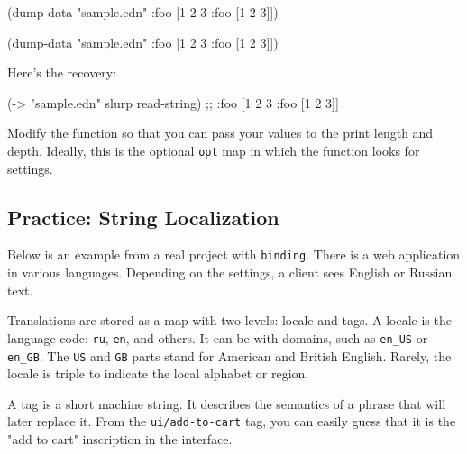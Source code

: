 \begin{english}
  \begin{clojure}
(dump-data "sample.edn"
  {:foo [1 2 3 {:foo [1 2 3]}]})
  \end{clojure}
\end{english}

\else

\begin{english}
  \begin{clojure}
(dump-data "sample.edn" {:foo [1 2 3 {:foo [1 2 3]}]})
  \end{clojure}
\end{english}

\fi

\noindent
Here's the recovery:

\begin{english}
  \begin{clojure}
(-> "sample.edn" slurp read-string)
;; {:foo [1 2 3 {:foo [1 2 3]}]}
  \end{clojure}
\end{english}


Modify the function so that you can pass your values to the print length and depth.
Ideally, this is the optional \verb|opt| map in which the function looks for settings.

\subsection{Practice: String Localization}

\label{translate}

Below is an example from a real project with \verb|binding|. There is a web application in various languages. Depending on the settings, a client sees English or Russian text.


Translations are stored as a map with two levels: locale and tags. A locale is the language code: \verb|ru|, \verb|en|, and others. It can be with domains, such as \verb|en_US| or \verb|en_GB|.
The \verb|US| and \verb|GB| parts stand for American and British English.
Rarely, the locale is triple to indicate the local alphabet or region.

A tag is a short machine string.
It describes the semantics of a phrase that will later replace it.
From the \verb|ui/add-to-cart| tag, you can easily guess that it is the "add to cart" inscription in the interface.

